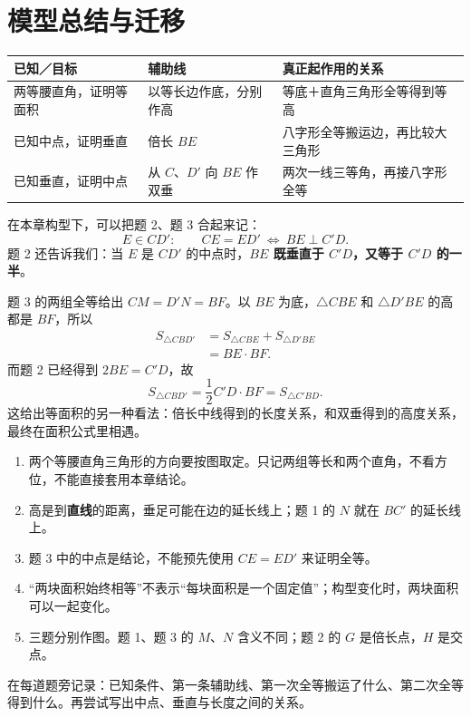 \section{模型总结与迁移}
\ifteachernotes
{}
\begin{center}\small
\renewcommand{\arraystretch}{1.3}
\begin{tabularx}{\linewidth}{@{}p{.26\linewidth}p{.22\linewidth}X@{}}
\toprule
已知／目标 & 辅助线 & 真正起作用的关系\\
\midrule
两等腰直角，证明等面积 & 以等长边作底，分别作高 & 等底＋直角三角形全等得到等高\\
\addlinespace
已知中点，证明垂直 & 倍长 \(BE\) & 八字形全等搬运边，再比较大三角形\\
\addlinespace
已知垂直，证明中点 & 从 \(C\)、\(D'\) 向 \(BE\) 作双垂 & 两次一线三等角，再接八字形全等\\
\bottomrule
\end{tabularx}
\end{center}

在本章构型下，可以把题 2、题 3 合起来记：
\[
E\in CD':\qquad CE=ED'\ \Longleftrightarrow\ BE\perp C'D.
\]
题 2 还告诉我们：当 \(E\) 是 \(CD'\) 的中点时，\textbf{\(BE\) 既垂直于 \(C'D\)，又等于 \(C'D\) 的一半}。

题 3 的两组全等给出 \(CM=D'N=BF\)。以 \(BE\) 为底，\(\triangle CBE\) 和 \(\triangle D'BE\) 的高都是 \(BF\)，所以
\begin{align*}
S_{\triangle CBD'}
&=S_{\triangle CBE}+S_{\triangle D'BE}\\
&=BE\cdot BF.
\end{align*}
而题 2 已经得到 \(2BE=C'D\)，故
\[
S_{\triangle CBD'}=\frac12 C'D\cdot BF=S_{\triangle C'BD}.
\]
这给出等面积的另一种看法：倍长中线得到的长度关系，和双垂得到的高度关系，最终在面积公式里相遇。

\begin{enumerate}
\item 两个等腰直角三角形的方向要按图取定。只记两组等长和两个直角，不看方位，不能直接套用本章结论。
\item 高是到\textbf{直线}的距离，垂足可能在边的延长线上；题 1 的 \(N\) 就在 \(BC'\) 的延长线上。
\item 题 3 中的中点是结论，不能预先使用 \(CE=ED'\) 来证明全等。
\item “两块面积始终相等”不表示“每块面积是一个固定值”；构型变化时，两块面积可以一起变化。
\item 三题分别作图。题 1、题 3 的 \(M\)、\(N\) 含义不同；题 2 的 \(G\) 是倍长点，\(H\) 是交点。
\end{enumerate}
\else
{}
在每道题旁记录：已知条件、第一条辅助线、第一次全等搬运了什么、第二次全等得到什么。再尝试写出中点、垂直与长度之间的关系。
\vspace{8\baselineskip}
\fi
